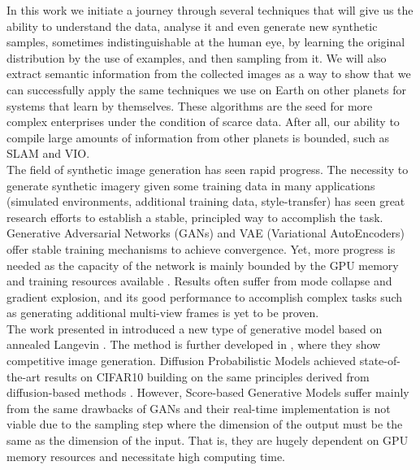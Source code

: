\documentclass[lettersize,journal]{IEEEtran}
\begin{document}
In this work we initiate a journey through several techniques that will give us the ability to understand the data, analyse it and even generate new synthetic samples, sometimes indistinguishable at the human eye, by learning the original distribution by the use of examples, and then sampling from it. We will also extract semantic information from the collected images as a way to show that we can successfully apply the same techniques we use on Earth on other planets for systems that learn by themselves. These algorithms are the seed for more complex enterprises under the condition of scarce data. After all, our ability to compile large amounts of information from other planets is bounded, such as SLAM and VIO.
\\

The field of synthetic image generation has seen rapid progress. The necessity to generate synthetic imagery given some training data in many applications (simulated environments, additional training data, style-transfer) has seen great research efforts to establish a stable, principled way to accomplish the task. Generative Adversarial Networks (GANs) \cite{Goodfellow14,Odena17,Antoniou18,Salimans16,Mescheder17,Mescheder18,Jolicoeur2019,Karras2019,Karras2021} and VAE (Variational AutoEncoders) \cite{Kingma14} offer stable training mechanisms to achieve convergence. Yet, more progress is needed as the capacity of the network is mainly bounded by the GPU memory and training resources available \cite{Chen17_3,Dosovitskiy16,Zhao17,Karras18,Wei18,Brock19}. Results often suffer from mode collapse and gradient explosion, and its good performance to accomplish complex tasks such as generating additional multi-view frames is yet to be proven. 
\\

The work presented in \cite{Song2019} introduced a new type of generative model based on annealed Langevin \cite{Roberts1996,Welling2011}. The method is further developed in \cite{Song2020}, where they show competitive image generation. Diffusion Probabilistic Models \cite{Ho2020} achieved state-of-the-art results on CIFAR10 building on the same principles derived from diffusion-based methods \cite{Goyal2017}. However, Score-based Generative Models \cite{Jolicoeur2021} suffer mainly from the same drawbacks of GANs and their real-time implementation is not viable due to the sampling step where the dimension of the output must be the same as the dimension of the input. That is, they are hugely dependent on GPU memory resources and necessitate high computing time.
\\
\end{document}
